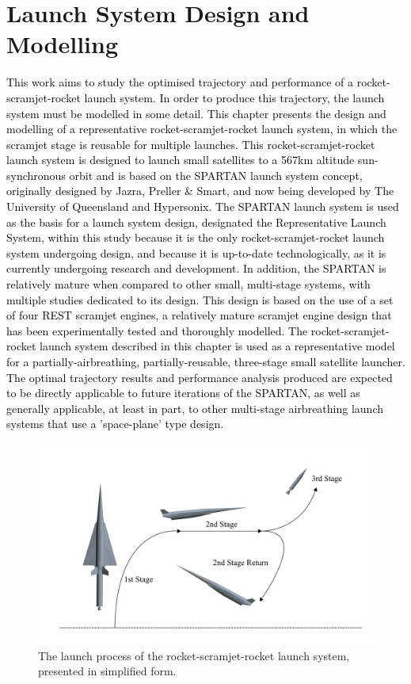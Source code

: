 
\cleardoublepage
\chapter{Launch System Design and Modelling}\label{chapter:Design}

\textcolor{black}{This work aims to study the optimised trajectory and performance of a rocket-scramjet-rocket launch system. In order to produce this trajectory, the launch system must be modelled in some detail.
	This chapter presents the design and modelling of a representative rocket-scramjet-rocket launch system, in which the scramjet stage is reusable for multiple launches. 
		This rocket-scramjet-rocket launch system is designed to launch small satellites to a 567km altitude sun-synchronous orbit and is based on the SPARTAN launch system concept, originally designed by Jazra, Preller \& Smart\cite{Preller2017b,Jazra2013}, and now being developed by The University of Queensland and Hypersonix.
		The SPARTAN launch system is used as the basis for a launch system design, designated the Representative Launch System, within this study because it is the only rocket-scramjet-rocket launch system undergoing design, 
		 and because it is up-to-date technologically, as it is currently undergoing research and development. In addition, the SPARTAN is relatively mature when compared to other small, multi-stage systems, with multiple studies dedicated to its design. This design is based on the use of a set of four REST scramjet engines, a relatively mature scramjet engine design that has been experimentally tested and thoroughly modelled.   
	The rocket-scramjet-rocket launch system described in this chapter is used as a representative model for a partially-airbreathing, partially-reusable, three-stage small satellite launcher. The optimal trajectory results and performance analysis produced are expected to be directly applicable to future iterations of the SPARTAN, as well as generally applicable, at least in part, to other multi-stage airbreathing launch systems that use a 'space-plane' type design. }
	

\begin{figure}[ht]
	\centering
	\includegraphics[width=0.9\linewidth]{figures/3_vehicle_design/Trajsimple}
	\caption{The launch process of the rocket-scramjet-rocket launch system, presented in simplified form.}
	\label{fig:Trajsimple}
\end{figure}



